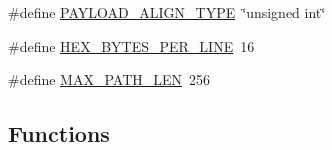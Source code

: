 \begin{DoxyCompactItemize}
\item 
\#define \hyperlink{openmote-cc2538_2lwip_2src_2apps_2httpd_2makefsdata_2makefsdata_8c_a473aff259445c51e8e17b19408eeeba9}{P\+A\+Y\+L\+O\+A\+D\+\_\+\+A\+L\+I\+G\+N\+\_\+\+T\+Y\+PE}~\char`\"{}unsigned int\char`\"{}
\item 
\#define \hyperlink{openmote-cc2538_2lwip_2src_2apps_2httpd_2makefsdata_2makefsdata_8c_a0a82658f43a21101784829e722a5bbfe}{H\+E\+X\+\_\+\+B\+Y\+T\+E\+S\+\_\+\+P\+E\+R\+\_\+\+L\+I\+NE}~16
\item 
\#define \hyperlink{openmote-cc2538_2lwip_2src_2apps_2httpd_2makefsdata_2makefsdata_8c_abdd33f362ae3bbdacb5de76473aa8a2f}{M\+A\+X\+\_\+\+P\+A\+T\+H\+\_\+\+L\+EN}~256
\end{DoxyCompactItemize}
\subsection*{Functions}
